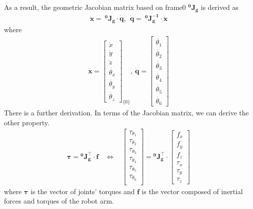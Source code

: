 As a result, the geometric Jacobian matrix based on frame{0} $\mathbf{^0J_g}$ is derived as
\begin{equation}
\label{eq:jg0}
\begin{split}
\boldsymbol{\dot{x}} = \ \mathbf{^0\!J_g} \cdot \boldsymbol{\dot{q}}
,\ \ 
\boldsymbol{\dot{q}} = \ \mathbf{^0\!J_g^{-1}} \cdot \boldsymbol{\dot{x}}
\end{split}
\end{equation}
where
\begin{equation}
\begin{split}
\boldsymbol{\dot{x}}
=
\begin{bmatrix}
\dot{x}\\
\dot{y}\\
\dot{z}\\
\dot{\theta _x}\\
\dot{\theta _y}\\
\dot{\theta _z}
\end{bmatrix}_{\!\{0\}}
,\ 
\boldsymbol{\dot{q}}
=
\begin{bmatrix}
\dot{\theta _1} \\ 
\dot{\theta _2} \\ 
\dot{\theta _3} \\ 
\dot{\theta _4} \\ 
\dot{\theta _5} \\ 
\dot{\theta _6} 
\end{bmatrix}
\end{split}
\end{equation}
There is a further derivation. In terms of the Jacobian matrix, we can derive the other property.
\begin{equation}
\begin{split}
\boldsymbol{\tau } = \mathbf{^0\!J^\top _g} \cdot \boldsymbol{f}\ \ \ \ 
\Leftrightarrow \ \ \ \ 
\begin{bmatrix}
\tau_{\theta _1} \\ 
\tau_{\theta _2} \\ 
\tau_{\theta _3} \\ 
\tau_{\theta _4} \\ 
\tau_{\theta _5} \\ 
\tau_{\theta _6} \\ 
\end{bmatrix}
=
\mathbf{^0\!J^\top _g} 
\cdot
\begin{bmatrix}
f_x \\ 
f_y \\ 
f_z \\ 
\tau_{x} \\ 
\tau_{y} \\ 
\tau_{z}
\end{bmatrix}
\end{split}
\end{equation}
where $\boldsymbol{\tau }$ is the vector of joints' torques and $\boldsymbol{f}$ is the vector composed of inertial forces and torques of the robot arm.
